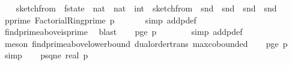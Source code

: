 \begin{isabellebody}
\ \ \isamarkupfalse%
\ sketch{\isacharunderscore}{\kern0pt}from\ {\isacharcolon}{\kern0pt}{\isacharcolon}{\kern0pt}\ {\isachardoublequoteopen}f{}{\isacharunderscore}{\kern0pt}state\ {\isasymRightarrow}\ {\isacharparenleft}{\kern0pt}nat\ {\isasymtimes}\ nat\ {\isasymRightarrow}\ int{\isacharparenright}{\kern0pt}{\isachardoublequoteclose}\ \ {\isachardoublequoteopen}sketch{\isacharunderscore}{\kern0pt}from\ {\isacharequal}{\kern0pt}\ snd\ {\isasymcirc}\ snd\ {\isasymcirc}\ snd\ {\isasymcirc}\ snd{\isachardoublequoteclose}\isanewline
\isanewline
\ \ \isamarkupfalse%
\ p{\isacharunderscore}{\kern0pt}prime{\isacharcolon}{\kern0pt}\ {\isachardoublequoteopen}Factorial{\isacharunderscore}{\kern0pt}Ring{\isachardot}{\kern0pt}prime\ p{\isachardoublequoteclose}\ \isanewline
\ \ \ \ \isamarkupfalse%
\ {\isacharparenleft}{\kern0pt}simp\ add{\isacharcolon}{\kern0pt}p{\isacharunderscore}{\kern0pt}def{\isacharparenright}{\kern0pt}\ \isanewline
\ \ \ \ \isamarkupfalse%
\ find{\isacharunderscore}{\kern0pt}prime{\isacharunderscore}{\kern0pt}above{\isacharunderscore}{\kern0pt}is{\isacharunderscore}{\kern0pt}prime\ \isamarkupfalse%
\ blast\isanewline
\isanewline
\ \ \isamarkupfalse%
\ p{\isacharunderscore}{\kern0pt}ge{\isacharunderscore}{\kern0pt}{}{\isacharcolon}{\kern0pt}\ {\isachardoublequoteopen}p\ {\isasymge}\ {}{\isachardoublequoteclose}\isanewline
\ \ \ \ \isamarkupfalse%
\ {\isacharparenleft}{\kern0pt}simp\ add{\isacharcolon}{\kern0pt}p{\isacharunderscore}{\kern0pt}def{\isacharparenright}{\kern0pt}\isanewline
\ \ \ \ \isamarkupfalse%
\ {\isacharparenleft}{\kern0pt}meson\ find{\isacharunderscore}{\kern0pt}prime{\isacharunderscore}{\kern0pt}above{\isacharunderscore}{\kern0pt}lower{\isacharunderscore}{\kern0pt}bound\ dual{\isacharunderscore}{\kern0pt}order{\isachardot}{\kern0pt}trans\ max{\isachardot}{\kern0pt}cobounded{}{\isacharparenright}{\kern0pt}\isanewline
\isanewline
\ \ \isamarkupfalse%
\ p{\isacharunderscore}{\kern0pt}ge{\isacharunderscore}{\kern0pt}{}{\isacharcolon}{\kern0pt}\ {\isachardoublequoteopen}p\ {\isachargreater}{\kern0pt}\ {}{\isachardoublequoteclose}\ \isamarkupfalse%
\ simp\isanewline
\isanewline
\ \ \isamarkupfalse%
\ p{\isacharunderscore}{\kern0pt}sq{\isacharunderscore}{\kern0pt}ne{\isacharunderscore}{\kern0pt}{}{\isacharcolon}{\kern0pt}\ {\isachardoublequoteopen}{\isacharparenleft}{\kern0pt}real\ p{\isacharparenright}{\kern0pt}{\isacharcircum}{\kern0pt}{}\ {\isasymnoteq}\ {}{\isachardoublequoteclose}\ \isanewline

\end{isabellebody}
